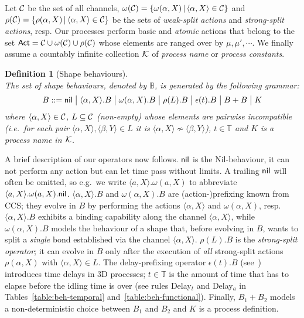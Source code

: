 \documentclass[11pt]{article}
\newcommand{\comp}{\sim}
\newcommand{\Act}{{\sf Act}}
\newcommand{\gor}{\;\big|\;}
\newcommand{\channels}{{\cal C}}
\newcommand{\pconst}{{\cal K}}
\newcommand{\bpa}{\mathbb{B}}
\newcommand{\nil}{{\sf nil}}
\def\name#1{\mbox{\sc #1}}
\newcommand{\timedomain}{{\mathbb T}}
\newtheorem{definition}{Definition}
\begin{document}
Let $\channels$ be the set of all channels, $\omega(\channels) = \{\omega(\alpha, X) \,|\, \langle \alpha, X \rangle \in \channels\}$ and $\rho(\channels) = \{\rho(\alpha, X) \,|\, \langle \alpha, X \rangle \in \channels\}$ be the sets of {\em weak-split actions} and {\em strong-split actions}, resp. Our processes perform basic and {\em atomic} actions that belong to the set $\Act = \channels \cup \omega(\channels) \cup \rho(\channels)$ whose elements are ranged over by $\mu, \mu',\cdots$. We finally assume a countably infinite collection $\pconst$ of {\em process name} or {\em process constants}.

\begin{definition}[Shape behaviours]
\ \\ The set of {\em shape behaviours}, denoted by  $\bpa$, is generated by the following grammar:
$$B ::=\nil \gor \langle \alpha, X \rangle.B \gor \omega(\alpha,X).B \gor  \rho(L). B \gor
\epsilon(t).B \gor B + B \gor K $$
where $\langle \alpha, X\rangle \in \channels$, $L \subseteq \channels$ (non-empty) whose elements
are pairwise incompatible (i.e.\ for each pair $\langle \alpha, X \rangle, \langle \beta, Y \rangle
\in L$ it is $\langle \alpha, X \rangle \not\comp \langle \beta, Y \rangle$), $t\in \timedomain$ and
$K$ is a process name in $\pconst$.
\end{definition}

A brief description of our operators now follows. $\nil$ is the Nil-behaviour, it can not perform any action but can let time pass without limits. A trailing $\nil$ will often be omitted, so e.g.\ we write $\langle a, X \rangle. \omega(a, X)$ to abbreviate $\langle a, X \rangle. \omega(a, X).\nil$. $\langle \alpha, X \rangle.B$ and $\omega(\alpha, X).B$ are (action-)prefixing known from CCS; they evolve in $B$ by performing the actions $\langle \alpha, X \rangle$ and $\omega(\alpha, X)$, resp. $\langle \alpha, X \rangle. B$ exhibits a binding capability along the channel $\langle \alpha, X \rangle$, while $\omega(\alpha, X).B$ models the behaviour of a shape that, before evolving in $B$, wants to split a {\em single} bond established via the channel $\langle \alpha, X \rangle$.
$\rho(L).B$ is the {\em strong-split operator}; it can evolve in $B$ only after the execution of
{\em all} strong-split actions $\rho(\alpha, X)$ with $\langle \alpha, X \rangle \in L$.
The delay-prefixing operator $\epsilon(t).B$ (see~\cite{Yi1990}) introduces time delays in 3D processes; $t \in \timedomain$ is the amount of time that has to elapse before the idling time is over (see rules \name{Delay$_t$} and \name{Delay$_a$} in Tables~\ref{table:beh-temporal} and~\ref{table:beh-functional}). Finally, $B_1 + B_2$ models a non-deterministic choice between $B_1$ and $B_2$ and $K$ is a process definition.
\end{document}
